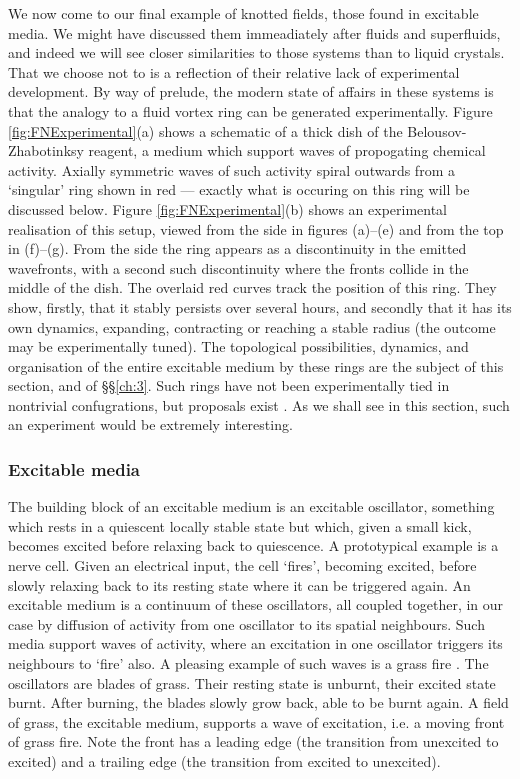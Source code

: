 We now come to our final example of knotted fields, those found in excitable media. We might have discussed them immeadiately after fluids and superfluids, and indeed we will see closer similarities to those systems than to liquid crystals. That we choose not to is a reflection of their relative lack of experimental development. By way of prelude, the modern state of affairs in these systems is that the analogy to a fluid vortex ring can be generated experimentally. Figure \ref{fig:FNExperimental}(a) shows a schematic of a thick dish of the Belousov-Zhabotinksy reagent, a medium which support waves of propogating chemical activity. Axially symmetric waves of such activity spiral outwards from a  `singular' ring shown in red --- exactly what is occuring on this ring will be discussed below. Figure \ref{fig:FNExperimental}(b) shows an experimental realisation of this setup, viewed from the side in figures (a)--(e) and from the top in (f)--(g). From the side the ring appears as a discontinuity in the emitted wavefronts, with a second such discontinuity where the fronts collide in the middle of the dish. The overlaid red curves track the position of this ring. They show, firstly, that it stably persists over several hours, and secondly that it has its own dynamics, expanding, contracting or reaching a stable radius (the outcome may be experimentally tuned). The topological possibilities, dynamics, and organisation of the entire excitable medium by these rings are the subject of this section, and of \S\S \ref{ch:3}. Such rings have not been experimentally tied in nontrivial confugrations, but proposals exist \cite{Sutcliffe}. As we shall see in this section, such an experiment would be extremely interesting.

\subsubsection{Excitable media}

The building block of an excitable medium is an excitable oscillator, something which rests in a quiescent locally stable state but which, given a small kick, becomes excited before relaxing back to quiescence. A prototypical example is a nerve cell. Given an electrical input, the cell `fires', becoming excited, before slowly relaxing back to its resting state where it can be triggered again. An excitable medium is a continuum of these oscillators, all coupled together, in our case by diffusion of activity from one oscillator to its spatial neighbours. Such media support waves of activity, where an excitation in one oscillator triggers its neighbours to `fire' also. A pleasing example of such waves is a grass fire \cite{Winfree1983}. The oscillators are blades of grass. Their resting state is unburnt, their excited state burnt. After burning, the blades slowly grow back, able to be burnt again. A field of grass, the excitable medium, supports a wave of excitation, i.e. a moving  front of grass fire. Note the front has a leading edge (the transition from unexcited to excited) and a trailing edge (the transition from excited to unexcited).


